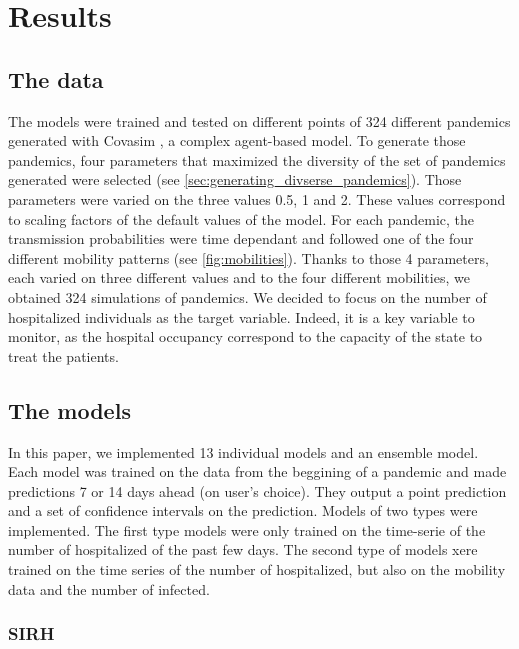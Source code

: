 \section*{Results}


\subsection{The data}

The models were trained and tested on different points of 324 different pandemics generated with Covasim \cite*{kerr2021covasim}, a complex agent-based model. 
To generate those pandemics, four parameters that maximized the diversity of the set of pandemics generated were selected (see \ref{sec:generating_divserse_pandemics}). 
Those parameters were varied on the three values 0.5, 1 and 2. 
These values correspond to scaling factors of the default values of the model. 
For each pandemic, the transmission probabilities were time dependant and followed one of the four different mobility patterns (see \ref{fig:mobilities}). 
Thanks to those 4 parameters, each varied on three different values and to the four different mobilities, we obtained 324 simulations of pandemics. 
We decided to focus on the number of hospitalized individuals as the target variable. 
Indeed, it is a key variable to monitor, as the hospital occupancy correspond to the capacity of the state to treat the patients. 


\subsection*{The models}

In this paper, we implemented 13 individual models and an ensemble model.
Each model was trained on the data from the beggining of a pandemic and made predictions 7 or 14 days ahead (on user's choice).
They output a point prediction and a set of confidence intervals on the prediction. 
Models of two types were implemented. 
The first type models were only trained on the time-serie of the number of hospitalized of the past few days. 
The second type of models xere trained on the time series of the number of hospitalized, but also on the mobility data and the number of infected. 

\subsubsection{SIRH}

